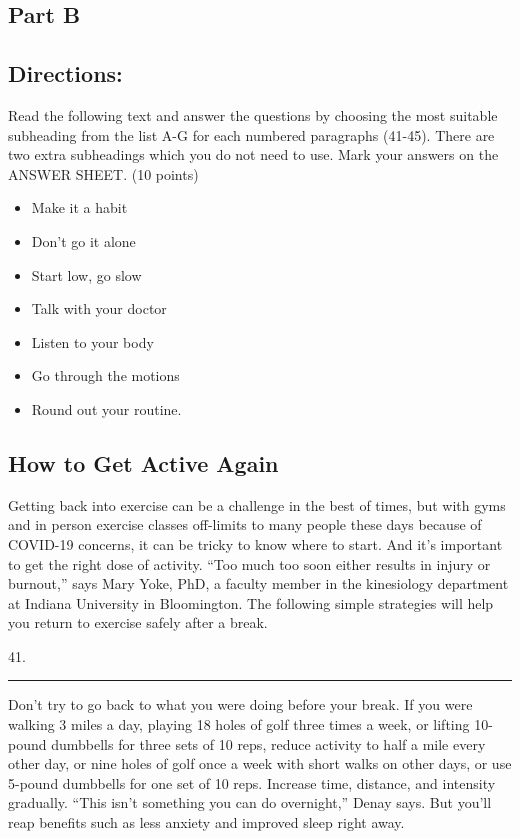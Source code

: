 \documentclass[UTF8,11pt]{ctexart}
\begin{document}
\subsection*{\textbf{Part B}}


\subsection*{\textbf{Directions:}}


Read the following text and answer the questions by choosing the most suitable subheading from the list A-G for each numbered paragraphs (41-45). There are two extra subheadings which you do not need to use. Mark your answers on the ANSWER SHEET. (10 points)


\begin{itemize}[leftmargin=2em,itemsep=.2em,topsep=.4em]\item[A.] Make it a habit
\item[B.] Don’t go it alone
\item[C.] Start low, go slow
\item[D.] Talk with your doctor
\item[E.] Listen to your body
\item[F.] Go through the motions
\item[G.] Round out your routine.
\end{itemize}

\subsection*{\textbf{How to Get Active Again}}


Getting back into exercise can be a challenge in the best of times, but with gyms and in person exercise classes off-limits to many people these days because of COVID-19 concerns, it can be tricky to know where to start. And it’s important to get the right dose of activity. “Too much too soon either results in injury or burnout,” says Mary Yoke, PhD, a faculty member in the kinesiology department at Indiana University in Bloomington. The following simple strategies will help you return to exercise safely after a break.


41. \par\noindent\rule{.95\linewidth}{.4pt}\par


Don’t try to go back to what you were doing before your break. If you were walking 3 miles a day, playing 18 holes of golf three times a week, or lifting 10-pound dumbbells for three sets of 10 reps, reduce activity to half a mile every other day, or nine holes of golf once a week with short walks on other days, or use 5-pound dumbbells for one set of 10 reps. Increase time, distance, and intensity gradually. “This isn’t something you can do overnight,” Denay says. But you’ll reap benefits such as less anxiety and improved sleep right away.
\end{document}
